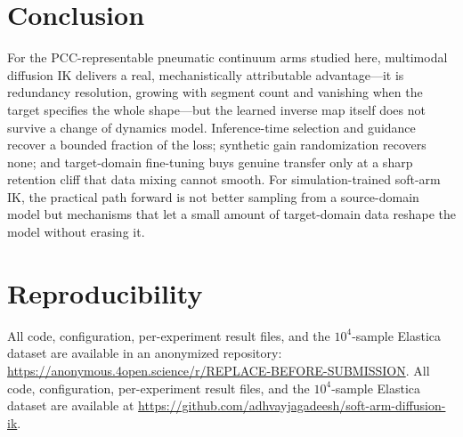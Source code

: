 \section{Conclusion}
For the PCC-representable pneumatic continuum arms studied here, multimodal
diffusion IK delivers a real, mechanistically attributable advantage---it is
redundancy resolution, growing with segment count and vanishing when the
target specifies the whole shape---but the learned inverse map itself does
not survive a change of dynamics model.
Inference-time selection and guidance recover a bounded fraction of the loss;
synthetic gain randomization recovers none; and target-domain fine-tuning
buys genuine transfer only at a sharp retention cliff that data mixing cannot
smooth. For simulation-trained soft-arm IK, the practical path forward is not
better sampling from a source-domain model but mechanisms that let a small
amount of target-domain data reshape the model without erasing it.

\section*{Reproducibility}
\ifanonymous
All code, configuration, per-experiment result files, and the
$10^4$-sample Elastica dataset are available in an anonymized repository:
\url{https://anonymous.4open.science/r/REPLACE-BEFORE-SUBMISSION}.
\else
All code, configuration, per-experiment result files, and the
$10^4$-sample Elastica dataset are available at
\url{https://github.com/adhvayjagadeesh/soft-arm-diffusion-ik}.
\fi
